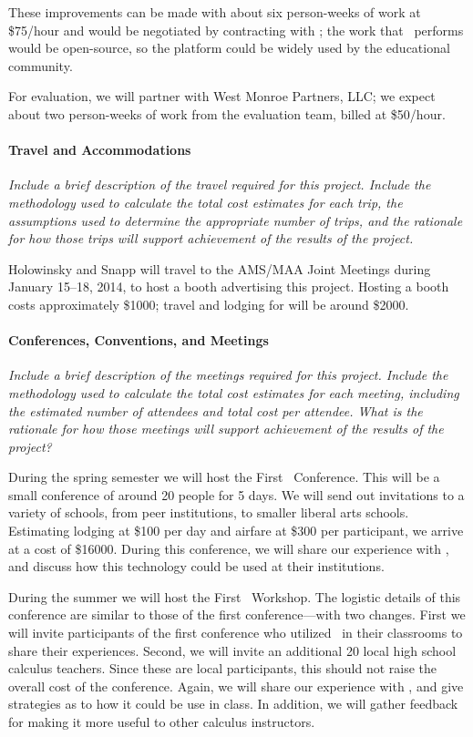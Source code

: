 These improvements can be made with about six person-weeks of work at
\$75/hour and would be negotiated by contracting with \gratisu; the
work that \gratisu\ performs would be open-source, so the platform
could be widely used by the educational community.

For evaluation, we will partner with West Monroe Partners, LLC; we
expect about two person-weeks of work from the evaluation team, billed
at \$50/hour.

\paragraph{Travel and Accommodations}
\textsl{Include a brief description of the travel required for this
  project.  Include the methodology used to calculate the total cost
  estimates for each trip, the assumptions used to determine the
  appropriate number of trips, and the rationale for how those trips
  will support achievement of the results of the project.}

\vspace{\topsep}

Holowinsky and Snapp will travel to the AMS/MAA Joint Meetings during
January 15--18, 2014, to host a booth advertising this project.
Hosting a booth costs approximately \$1000; travel and lodging for
will be around \$2000.


\paragraph{Conferences, Conventions, and Meetings}
\textsl{Include a brief description of the meetings required for this
  project. Include the methodology used to calculate the total cost
  estimates for each meeting, including the estimated number of
  attendees and total cost per attendee. What is the rationale for how
  those meetings will support achievement of the results of the
  project?}

\vspace{\topsep}

During the spring semester we will host the First
\mooculus\ Conference. This will be a small conference of around 20
people for 5 days. We will send out invitations to a variety of
schools, from peer institutions, to smaller liberal arts
schools. Estimating lodging at \$100 per day and airfare at \$300 per
participant, we arrive at a cost of \$16000. During this conference,
we will share our experience with \mooculus, and discuss how this
technology could be used at their institutions.

During the summer we will host the First \mooculus\ Workshop. The
logistic details of this conference are similar to those of the first
conference---with two changes. First we will invite participants of
the first conference who utilized \mooculus\ in their classrooms to
share their experiences. Second, we will invite an additional 20 local
high school calculus teachers. Since these are local participants,
this should not raise the overall cost of the conference. Again, we
will share our experience with \mooculus, and give strategies as to
how it could be use in class. In addition, we will gather feedback for
making it more useful to other calculus instructors.
